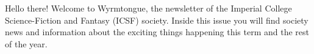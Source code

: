 Hello there! Welcome to Wyrmtongue, the newsletter of the Imperial College Science-Fiction and Fantasy (ICSF) society. Inside this issue you will find society news and information about the exciting things happening this term and the rest of the year. 